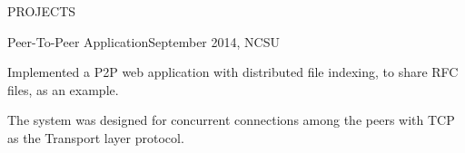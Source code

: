 \documentclass{resume} %
\begin{document}
\begin{rSection}{PROJECTS}
    \begin{comment} %
    \begin{rSubsectionProject}{Key Recovery For 802.11 Wireless Equivalent Privacy(WEP) Protocol}{November 2014, NCSU}
    	\item Literature review of attack on the WEP link-layer security protocol.
    	\item Implemented a C program to recover WEP's shared key, based on the partial key exposure in RC-4 Stream cipher discovered by Fluhrer, Mantin, and Shamir.
    \end{rSubsectionProject}
    \end{comment}
    
    \begin{comment} %
    \begin{rSubsectionProject}{Code Optimization Using SIMD architecture}{October 2014, NCSU}
    	\item Optimized the alpha blending and gravity simulation program by taking advantage of the Beaglebone's SIMD \\architecture running Debian OS.
    \end{rSubsectionProject}
    \end{comment}
    
    \begin{comment} %
    \begin{rSubsectionProject}{Point-To-Multipoint File Transfer Protocol}{October 2014, NCSU}
    	\item Implemented a sophisticated and reliable point-to-multipoint file transfer protocol over UDP as against the point-to-point transfer limitation of FTP, given the utilization of TCP for reliable data transfer between the endpoints. 
        \item A stop-and-wait ARQ scheme was implemented at the application layer to provide reliability.
    \end{rSubsectionProject}
\end{comment}

    \begin{rSubsectionProject}{Peer-To-Peer Application}{September 2014, NCSU}
      \item Implemented a P2P web application with distributed file indexing, to share RFC files, as an example.
      \item The system was designed for concurrent connections among the peers with TCP as the Transport layer protocol.
    \end{rSubsectionProject}


\end{rSection}
\end{document}
